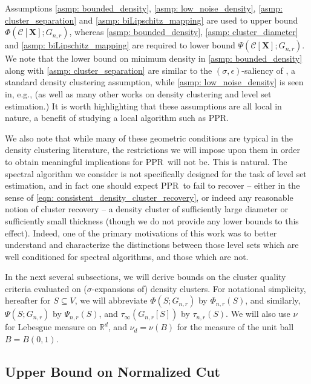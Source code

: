 \documentclass{article}
\newcommand{\Reals}{\mathbb{R}}
\newcommand{\Rd}{\Reals^d}
\newcommand{\1}{\mathbf{1}}
\newcommand{\Xbf}{\mathbf{X}}
\newcommand{\Cset}{\mathcal{C}}
\newcommand{\ppr}{{\sc PPR}}
\newcommand{\pprspace}{{\sc PPR~}}
\theoremstyle{aldenthm}
\theoremstyle{aldenrmrk}
\begin{document}
Assumptions \ref{asmp: bounded_density}, \ref{asmp: low_noise_density},
\ref{asmp: cluster_separation} and \ref{asmp: biLipschitz_mapping} are used to upper bound $\Phi(\Cset[\Xbf];
G_{n,r})$, whereas \ref{asmp: bounded_density}, \ref{asmp: cluster_diameter} and \ref{asmp: biLipschitz_mapping} are required to lower bound $\Psi(\Cset[\Xbf]; G_{n,r})$. We note that the
lower bound on minimum density in \ref{asmp: bounded_density} along with \ref{asmp:  
cluster_separation} are similar to the $(\sigma,\epsilon)$-saliency of
\citep{chaudhuri2010}, a standard density clustering assumption, while
\ref{asmp: low_noise_density} is seen in, e.g., \citep{singh2009} (as well as
many other works on density clustering and level set estimation.)  It is worth
highlighting that these assumptions are all local in nature, a benefit of
studying a local algorithm such as \ppr.



We also note that while many of these geometric conditions are typical in the density clustering literature, the restrictions we will impose upon them in order to obtain meaningful implications for \pprspace will not be. This is natural. The spectral algorithm we consider is not specifically designed for the task of level set estimation, and in fact one should expect \pprspace to fail to recover -- either in the sense of \eqref{eqn: consistent_density_cluster_recovery}, or indeed any reasonable notion of cluster recovery -- a density cluster of sufficiently large diameter or sufficiently small thickness (though we do not provide any lower bounds to this effect). Indeed, one of the primary motivations of this work was to better understand and characterize the distinctions between those level sets which are well conditioned for spectral algorithms, and those which are not.


In the next several subsections, we will derive bounds on the cluster quality
criteria evaluated on ($\sigma$-expansions of) density clusters. For notational simplicity,
hereafter for $S \subseteq V$, we will abbreviate $\Phi(S; G_{n,r})$ by
$\Phi_{n,r}(S)$, and similarly, $\Psi(S; G_{n,r})$ by $\Psi_{n,r}(S)$, and
$\tau_{\infty}(G_{n,r}[S])$ by $\tau_{n,r}(S)$. We will also use $\nu$ for
Lebesgue measure on $\Rd$, and $\nu_d = \nu(B)$ for the measure of the unit ball
$B=B(0,1)$.  

\subsection{Upper Bound on Normalized Cut}
\end{document}

